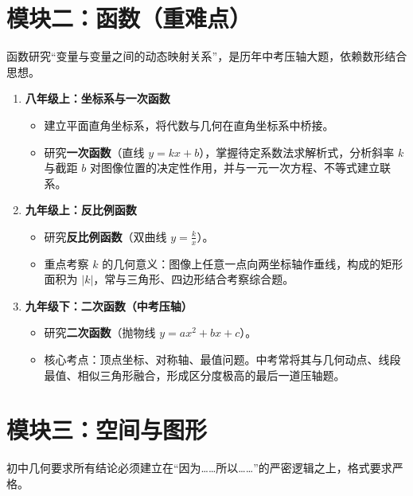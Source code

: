 \documentclass[11pt,a4paper]{ctexart}
\begin{document}
\section{模块二：函数（重难点）}
函数研究“变量与变量之间的动态映射关系”，是历年中考压轴大题，依赖数形结合思想。

\begin{enumerate}[label=\textbf{\thesection.\arabic*}]
    \item \textbf{八年级上：坐标系与一次函数}
    \begin{itemize}
        \item 建立平面直角坐标系，将代数与几何在直角坐标系中桥接。
        \item 研究\textbf{一次函数}（直线 $y = kx + b$），掌握待定系数法求解析式，分析斜率 $k$ 与截距 $b$ 对图像位置的决定性作用，并与一元一次方程、不等式建立联系。
    \end{itemize}
    
    \item \textbf{九年级上：反比例函数}
    \begin{itemize}
        \item 研究\textbf{反比例函数}（双曲线 $y = \frac{k}{x}$）。
        \item 重点考察 $k$ 的几何意义：图像上任意一点向两坐标轴作垂线，构成的矩形面积为 $|k|$，常与三角形、四边形结合考察综合题。
    \end{itemize}
    
    \item \textbf{九年级下：二次函数（中考压轴）}
    \begin{itemize}
        \item 研究\textbf{二次函数}（抛物线 $y = ax^2 + bx + c$）。
        \item 核心考点：顶点坐标、对称轴、最值问题。中考常将其与几何动点、线段最值、相似三角形融合，形成区分度极高的最后一道压轴题。
    \end{itemize}
\end{enumerate}

\section{模块三：空间与图形}
初中几何要求所有结论必须建立在“因为……所以……”的严密逻辑之上，格式要求严格。
\end{document}
